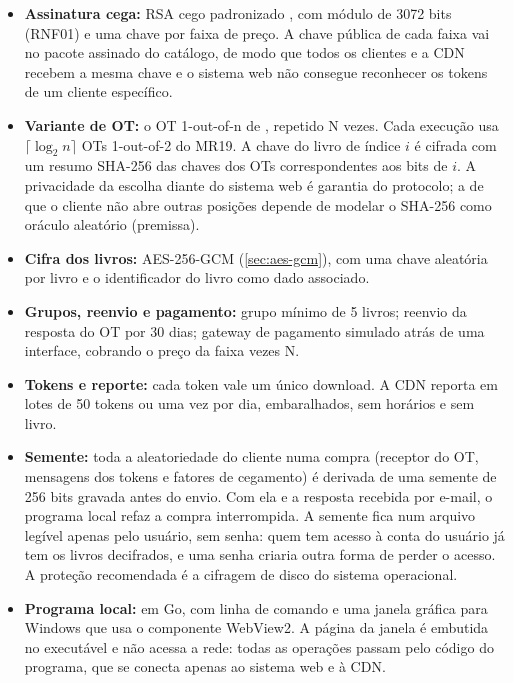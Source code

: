 \begin{itemize}
\item \textbf{Assinatura cega:} RSA cego padronizado \cite{rfc9474}, com
módulo de 3072 bits (RNF01) e uma chave por faixa de preço. A chave pública de
cada faixa vai no pacote assinado do catálogo, de modo que todos os clientes e
a CDN recebem a mesma chave e o sistema web não consegue reconhecer os tokens
de um cliente específico.

\item \textbf{Variante de OT:} o OT 1-out-of-n de ,
repetido N vezes. Cada execução usa $\lceil \log_2 n \rceil$ OTs 1-out-of-2 do
MR19. A chave do livro de índice $i$ é cifrada com um resumo SHA-256 das chaves
dos OTs correspondentes aos bits de $i$. A privacidade da escolha diante do
sistema web é garantia do protocolo; a de que o cliente não abre outras
posições depende de modelar o SHA-256 como oráculo aleatório (premissa).

\item \textbf{Cifra dos livros:} AES-256-GCM (\autoref{sec:aes-gcm}), com uma chave aleatória por livro
e o identificador do livro como dado associado.

\item \textbf{Grupos, reenvio e pagamento:} grupo mínimo de 5 livros; reenvio
da resposta do OT por 30 dias; gateway de pagamento simulado atrás de uma
interface, cobrando o preço da faixa vezes N.

\item \textbf{Tokens e reporte:} cada token vale um único download. A CDN
reporta em lotes de 50 tokens ou uma vez por dia, embaralhados, sem horários e
sem livro.

\item \textbf{Semente:} toda a aleatoriedade do cliente numa compra (receptor
do OT, mensagens dos tokens e fatores de cegamento) é derivada de uma semente
de 256 bits gravada antes do envio. Com ela e a resposta recebida por e-mail, o
programa local refaz a compra interrompida. A semente fica num arquivo legível
apenas pelo usuário, sem senha: quem tem acesso à conta do usuário já tem os
livros decifrados, e uma senha criaria outra forma de perder o acesso. A
proteção recomendada é a cifragem de disco do sistema operacional.

\item \textbf{Programa local:} em Go, com linha de comando e uma janela gráfica
para Windows que usa o componente WebView2. A página da janela é embutida no
executável e não acessa a rede: todas as operações passam pelo código do
programa, que se conecta apenas ao sistema web e à CDN.


\end{itemize}
